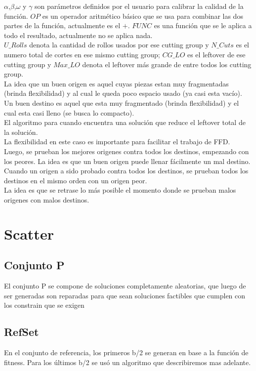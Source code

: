 \documentclass[letter,10pt]{article}
\begin{document}
$\alpha$,$\beta$,$\omega$ y $\gamma$ son par\'ametros definidos por el usuario para calibrar la calidad de la funci\'on. $OP$ es un operador aritm\'etico
b\'asico que se usa para combinar las dos partes de la funci\'on, actualmente es el $+$. $FUNC$ es una funci\'on que se le aplica a todo el resultado,
actualmente no se aplica nada.\\
\indent $U\_Rolls$ denota la cantidad de rollos usados por ese cutting group y $N\_Cuts$ es el numero total de cortes en ese mismo cutting group;
$CG\_LO$ es el leftover de ese cutting group y $Max\_LO$ denota el leftover m\'as grande de entre todos los cutting group.\\
\indent La idea que un buen origen es aquel cuyas piezas estan muy fragmentadas (brinda flexibilidad) y al cual le queda poco espacio usado
(ya casi esta vac\'io). Un buen destino es aquel que esta muy fragmentado (brinda flexibilidad) y el cual esta casi lleno (se busca lo compacto).\\
\indent El algoritmo para cuando encuentra una soluci\'on que reduce el leftover total de la soluci\'on.\\
\indent La flexibilidad en este caso es importante para facilitar el trabajo de FFD.\\
\indent Luego, se prueban los mejores origenes contra todos los destinos, empezando con los peores. La idea es que un buen origen puede llenar f\'acilmente
un mal destino. Cuando un origen a sido probado contra todos los destinos, se prueban todos los destinos en el mismo orden con un origen peor.\\
\indent La idea es que se retrase lo m\'as posible el momento donde se prueban malos origenes con malos destinos.

\section{Scatter}
\subsection{Conjunto P}
El conjunto P se compone de soluciones completamente aleatorias, que luego de ser generadas
son reparadas para que sean soluciones factibles que cumplen con los constrain que se exigen

\subsection{RefSet}
En el conjunto de referencia, los primeros b/2 se generan en base a la
funci\'on de fitness. Para los \'ultimos b/2 se us\'o un algoritmo que describiremos mas adelante.
\end{document}
